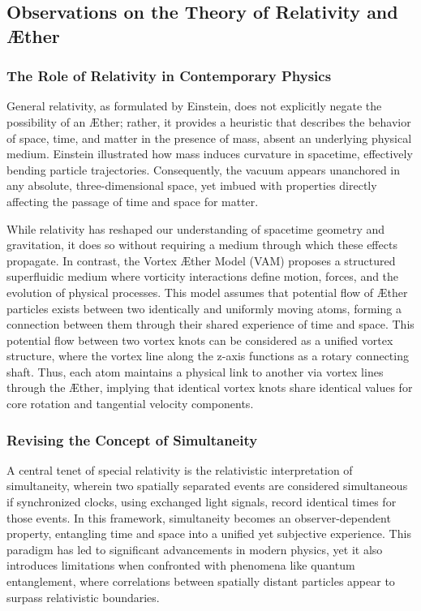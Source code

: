 
\subsection{Observations on the Theory of Relativity and \AE ther}\label{subsec:observations-on-the-theory-of-relativity}
\subsubsection*{The Role of Relativity in Contemporary Physics}
General relativity, as formulated by Einstein, does not explicitly negate the possibility of an \AE ther; rather, it provides a heuristic that describes the behavior of space, time, and matter in the presence of mass, absent an underlying physical medium.
Einstein illustrated how mass induces curvature in spacetime, effectively bending particle trajectories.
Consequently, the vacuum appears unanchored in any absolute, three-dimensional space, yet imbued with properties directly affecting the passage of time and space for matter.

While relativity has reshaped our understanding of spacetime geometry and gravitation, it does so without requiring a medium through which these effects propagate.
In contrast, the Vortex \AE ther Model (VAM) proposes a structured superfluidic medium where vorticity interactions define motion, forces, and the evolution of physical processes.
This model assumes that potential flow of \AE ther particles exists between two identically and uniformly moving atoms, forming a connection between them through their shared experience of time and space.
This potential flow between two vortex knots can be considered as a unified vortex structure, where the vortex line along the z-axis functions as a rotary connecting shaft.
Thus, each atom maintains a physical link to another via vortex lines through the \AE ther, implying that identical vortex knots share identical values for core rotation and tangential velocity components.

\subsubsection*{Revising the Concept of Simultaneity}
A central tenet of special relativity is the relativistic interpretation of simultaneity, wherein two spatially separated events are considered simultaneous if synchronized clocks, using exchanged light signals, record identical times for those events.
In this framework, simultaneity becomes an observer-dependent property, entangling time and space into a unified yet subjective experience.
This paradigm has led to significant advancements in modern physics, yet it also introduces limitations when confronted with phenomena like quantum entanglement, where correlations between spatially distant particles appear to surpass relativistic boundaries.

